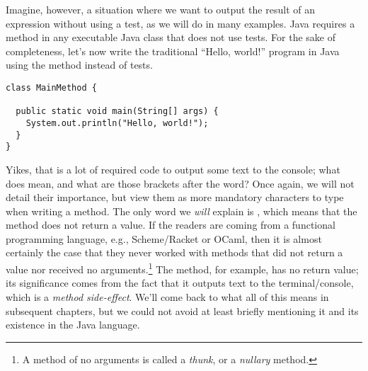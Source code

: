 Imagine, however, a situation where we want to output the result of an expression without using a test, as we will do in many examples. 
Java requires a  method in any executable Java class that does not use tests. 
For the sake of completeness, let's now write the traditional ``Hello, world!'' program in Java using the  method instead of tests.

\begin{lstlisting}[language=MyJava]
class MainMethod {

  public static void main(String[] args) {
    System.out.println("Hello, world!");
  }
}
\end{lstlisting}

Yikes, that is a lot of required code to output some text to the console; what does  mean, and what are those \ttt{[]} brackets after the  word?
Once again, we will not detail their importance, but view them as more mandatory characters to type when writing a  method. 
The only word we \emph{will} explain is , which means that the method does not return a value. 
If the readers are coming from a functional programming language, e.g., Scheme/Racket or OCaml, then it is almost certainly the case that they never worked with methods that did not return a value nor received no arguments.\footnote{A method of no arguments is called a \emph{thunk}, or a \emph{nullary} method.} 
The  method, for example, has no return value; its significance comes from the fact that it outputs text to the terminal/console, which is a \emph{method side-effect}. 
We'll come back to what all of this means in subsequent chapters, but we could not avoid at least briefly mentioning it and its existence in the Java language.



